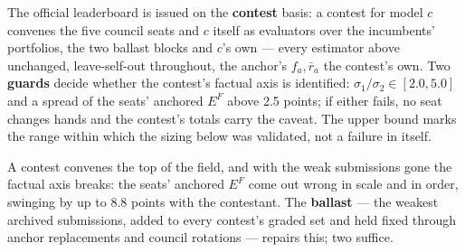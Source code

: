 \documentclass{article}
\begin{document}
The official leaderboard is issued on the \textbf{contest} basis: a contest for model \(c\) convenes the five council seats and \(c\) itself as evaluators over the incumbents' portfolios, the two ballast blocks and \(c\)'s own --- every estimator above unchanged, leave-self-out throughout, the anchor's \(f_a,\bar r_a\) the contest's own. Two \textbf{guards} decide whether the contest's factual axis is identified: \(\sigma_1/\sigma_2\in[2.0,5.0]\) and a spread of the seats' anchored \(E^{F}\) above 2.5 points; if either fails, no seat changes hands and the contest's totals carry the caveat. The upper bound marks the range within which the sizing below was validated, not a failure in itself.

A contest convenes the top of the field, and with the weak submissions gone the factual axis breaks: the seats' anchored \(E^{F}\) come out wrong in scale and in order, swinging by up to 8.8 points with the contestant. The \textbf{ballast} --- the weakest archived submissions, added to every contest's graded set and held fixed through anchor replacements and council rotations --- repairs this; two suffice.
\end{document}
